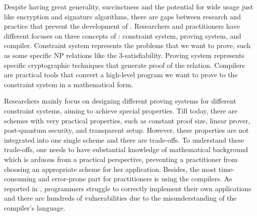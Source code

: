 \documentclass[letterpaper,twocolumn,10pt]{article}
\theoremstyle{definition}
\newcommand{\ZK}{\text{zk-SNARK}\xspace}
\newcommand{\new}[1]{{#1}\xspace}
\begin{document}
\new{
	Despite \ZK having great generality,  succinctness and the potential for wide usage just like encryption and signature algorithms, there are gaps between research and practice that prevent the development of \ZK. 
	Researchers and practitioners have different focuses on three concepts of \ZK: constraint system, proving system, and compiler. Constraint system represents the problems that we want to prove, such as some specific NP relations like the 3-satisfiability. Proving system represents specific cryptographic techniques that generate proof of the relation. Compilers are practical tools that convert a high-level program we want to prove to the constraint system in a mathematical form.
	
	Researchers mainly focus on designing different proving systems for different constraint systems, aiming to achieve special properties. Till today, there are schemes with very practical properties, such as constant proof size, linear prover, post-quantum security, and transparent setup. However, these properties are not integrated into one single scheme and there are trade-offs. To understand these trade-offs, one needs to have substantial knowledge of \ZK mathematical background which is arduous from a practical perspective, preventing a practitioner from choosing an appropriate scheme for her application. Besides, the most time-consuming and error-prone part for practitioners is using the compilers. As reported in \cite{campanelli2017zero,wen2023practical,ozdemir2023bounded,chaliasos2024sok}, programmers struggle to correctly implement their own \ZK applications and there are hundreds of vulnerabilities due to the misunderstanding of the compiler's language.}
\end{document}
